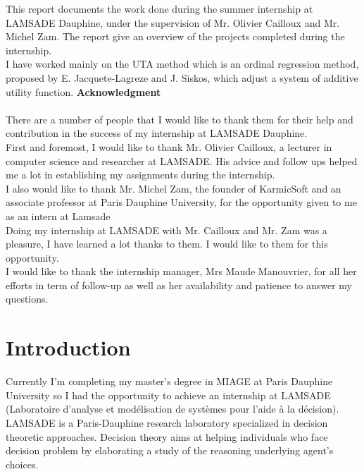 \documentclass{report}
\begin{document}
\abstract 
This report documents the work done during the summer internship at LAMSADE Dauphine, under the supervision of Mr. Olivier Cailloux and Mr. Michel Zam. The report give an overview of the projects completed during the internship.\\
I have worked mainly on the UTA method which is an ordinal regression method, proposed by E. Jacquete-Lagreze and J. Siskos, which adjust a system of additive utility function.
\newpage
{ \huge \bfseries Acknowledgment}\\[0.3cm]
\\

There are a number of people that I would like to thank them for their help and contribution in the success of my internship at LAMSADE Dauphine.\\

First and foremost, I would like to thank Mr. Olivier Cailloux, a lecturer in computer science and researcher at LAMSADE. His advice and follow ups helped me a lot in establishing my assignments during the internship.\\

I also would like to thank Mr. Michel Zam, the founder of KarmicSoft and an associate professor at Paris Dauphine University, for the opportunity given to me as an intern at Lamsade\\

Doing my internship at LAMSADE with Mr. Cailloux and Mr. Zam was a pleasure, I have learned a lot thanks to them. I would like to them for this opportunity.\\

I would like to thank the internship manager, Mrs Maude Manouvrier, for all her efforts in term of follow-up as well as her availability and patience to answer my questions.\\
\newpage
\tableofcontents{}
\newpage
{}

\chapter{Introduction}
Currently I'm completing my master's degree in MIAGE at Paris Dauphine University so I had the opportunity to achieve an internship at LAMSADE (Laboratoire d'analyse et modélisation de systèmes pour l'aide à la décision). LAMSADE is a Paris-Dauphine research laboratory specialized in decision theoretic approaches. Decision theory aims at helping individuals who face decision problem by elaborating a study of the reasoning underlying agent's choices. \\
\end{document}
